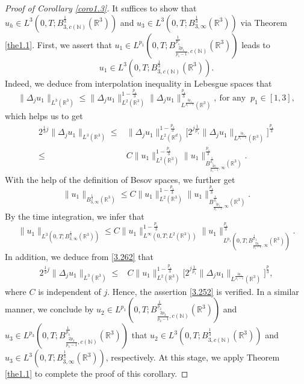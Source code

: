 \documentclass[11pt]{article}
\theoremstyle{plain}\newtheorem{definition}{Definition}[section]
\theoremstyle{definition}\newtheorem{theorem}{Theorem}[section]
\theoremstyle{plain}\newtheorem{lemma}[theorem]{Lemma}
\theoremstyle{plain}\newtheorem{coro}[theorem]{Corollary}
\theoremstyle{plain}\newtheorem{prop}[theorem]{Proposition}
\theoremstyle{remark}\newtheorem{remark}{Remark}[section]
\newcommand{\B}{\Big}
\newcommand{\be}{\begin{equation}}
\newcommand{\ee}{\end{equation}}
\newcommand{\ba}{\begin{aligned}}
\newcommand{\ea}{\end{aligned}}
\newcommand{\f}{\frac}
\numberwithin{equation}{section}
\begin{document}
\begin{proof}[Proof of  Corollary \ref{coro1.3}]
It suffices to show that $ u_{h}\in L^{3}(0,T;
B^{\f13}_{3,c(\mathbb{N})}(\mathbb{R}^{3}))$ and $ u_{3}\in L^{3}(0,T;
B^{\f13}_{3, \infty}(\mathbb{R}^{3}))$ via Theorem \ref{the1.1}. First, we assert   that $u_{1}\in L^{p_{1}}(0,T;
B^{\f{1}{p_{1}}}_{\f{2p_{1}}{p_{1}-1},c(\mathbb{N})}(\mathbb{R}^{3}))$ leads to \be\label{3.252}
u_{1}\in L^{3}(0,T;
B^{\f13}_{3,c(\mathbb{N})}(\mathbb{R}^{3})).
 \ee
 Indeed, we deduce from interpolation inequality in Lebesgue spaces that
$$ \|\Delta_{j}u_{1}\|_{L^{3}(\mathbb{R}^{3})}\leq \|\Delta_{j}u_{1}\|_{L^{2}(\mathbb{R}^{3})}^{1-\f{p_{1}}{3}}
 \|\Delta_{j}u_{1}\|_{L^{\f{2p_{1}}{p_{1}-1}}(\mathbb{R}^{3})}^{\f{p_{1}}{3}},\ \text{for\ any }\ p_{1}\in [1,3],$$
which helps us to get
\be\ba\label{3.262}
 2^{\f13 j}\|\Delta_{j}u_{1}\|_{L^{3}(\mathbb{R}^{3})}\leq& \|\Delta_{j}u_{1}\|_{L^{2}(\mathbb{R}^{d})}^{1-\f{p_{1}}{3}}
\B[2^{j\f{1}{p_1}}\|\Delta_{j}u_{1}\|_{L^{\f{2p_{1}}{p_{1}-1}}(\mathbb{R}^{3})}\B]^{\f{p_{1}}{3}}\\
\leq& C\| u_{1}\|_{L^{2}(\mathbb{R}^{3})}^{1-\f{p_{1}}{3}}  \|u_{1}\|^{\f{p_{1}}{3}}_{
B^{\f{1}{p_{1}}}_{\f{2p_{1}}{p_{1}-1},\infty}(\mathbb{R}^{3})}.
\ea\ee
With the help of the definition of Besov spaces, we further get
$$ \|u_{1}\|_{
B^{\f13}_{3,\infty}(\mathbb{R}^{3})}\leq  C\| u_{1}\|_{L^{2}(\mathbb{R}^{3})}^{1-\f{p_{1}}{3}}  \|u_{1}\|^{\f{p_{1}}{3}}_{
B^{\f{1}{p_{1}}}_{\f{2p_{1}}{p_{1}-1},\infty}(\mathbb{R}^{3})}.$$
By the time integration, we infer that
$$ \|u_{1}\|_{L^{3}(0,T;
B^{\f13}_{3,\infty}(\mathbb{R}^{3}))}\leq  C\| u_{1}\|_{L^{\infty}(0,T;L^{2}(\mathbb{R}^{3}))}^{1-\f{p_{1}}{3}}  \|u_{1}\|^{\f{p_{1}}{3}}_{L^{p_{1}}(0,T;
B^{\f1p_{1}}_{\f{2p_{1}}{p_{1}-1},\infty}(\mathbb{R}^{3}))}.$$
In addition, we deduce  from \eqref{3.262} that
$$\ba 2^{\f13 j}\|\Delta_{j}u_{1}\|_{L^{3}(\mathbb{R}^{3})}\leq& C\| u_{1}\|_{L^{2}(\mathbb{R}^{3})}^{1-\f{p_{1}}{3}}
\B[2^{j\f{1}{p_{1}}}\|\Delta_{j}u_{1}\|_{L^{\f{2p_{1}}{p_{1}-1}}(\mathbb{R}^{3})}\B]^{\f{p}{3}},
\ea$$
where $C$ is independent of $j$.
Hence, the assertion \eqref{3.252} is verified.
In a similar
manner, we conclude by $u_{2}\in L^{p_{1}}(0,T;
B^{\f{1}{p_{2}}}_{\f{2p_{2}}{p_{2}-1},c(\mathbb{N})}(\mathbb{R}^{3}))$ and $u_{3}\in L^{p_{3}}(0,T;
B^{\f{1}{p_{3}}}_{\f{2p_{3}}{p_{3}-1},c(\mathbb{N})}(\mathbb{R}^{3}))$ that
$
 u_{2}\in L^{3}(0,T;
B^{\f13}_{3,c(\mathbb{N})}(\mathbb{R}^{3}))$ and $ u_{3}\in L^{3}(0,T;
B^{\f13}_{3, \infty}(\mathbb{R}^{3}))$, respectively. At this stage, we apply Theorem \ref{the1.1} to   complete the proof of this corollary.
\end{proof}
\end{document}
